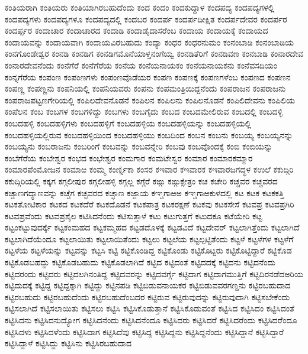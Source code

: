 {ಕಂತಿಯರಾಗಿ
ಕಂತಿಯರು
ಕಂತಿಯಾಗಿರಬಹುದೆಂದು
ಕಂದ
ಕಂದಂ
ಕಂದಕುದ್ದಾಳ
ಕಂದಪದ್ಯ
ಕಂದಪದ್ಯಗಳಲ್ಲಿ
ಕಂದಪದ್ಯಗಳು
ಕಂದಪದ್ಯಗಳೂ
ಕಂದಪದ್ಯದಲ್ಲಿ
ಕಂದಬರ
ಕಂದರ್ಪ
ಕಂದರ್ಪದೀಕ್ಷಿತ
ಕಂದರ್ಪದೇವರ
ಕಂದರ್ಪರ
ಕಂದರ್ಪ್ಪರ
ಕಂದಾಚಾರ
ಕಂದಾಚಾರದ
ಕಂದಾಡಿ
ಕಂದಾಡೈದಾಸರೆಂಬ
ಕಂದಾಯ
ಕಂದಾಯಕ್ಕೆ
ಕಂದಾಯದ
ಕಂದಾಯವನ್ನು
ಕಂದಾಯವಾಗಿ
ಕಂದಾಯವಿರಬಹುದು
ಕಂದ್ಯಾ
ಕಂಧರ
ಕಂಧರನುಮಂ
ಕಂನಂಬಾಡಿ
ಕಂನಂಬಾಡಿಯ
ಕಂನಗೊಂಡೇಶ್ವರ
ಕಂನಡಿ
ಕಂನಡಿಗ
ಕಂನಡಿಗಮೊನೆಯಾಳ್ತನಂಗೆಯ್ವ
ಕಂನಡಿತೆರಿಗೆ
ಕಂನಡಿವಣ
ಕಂನಬಾಡಿ
ಕಂನಾರದೇವ
ಕಂನಾರದೇವನೆಂದು
ಕಂನೆಗೆರೆ
ಕಂನೆಗೆರೆಯ
ಕಂನೆಯ
ಕಂನೆಯನಾಯಕಂ
ಕಂನೆಯನಾಯಕನು
ಕಂನೆವಸದಿಯಂ
ಕಂನ್ನಗೆರೆಯ
ಕಂಪಂಣ
ಕಂಪಂಣಗಳು
ಕಂಪಂಣವೊಡೆಯರ
ಕಂಪಣ
ಕಂಪಣಕ್ಕೆ
ಕಂಪಣಗಳೆಂಬ
ಕಂಪಣದ
ಕಂಪಣನ
ಕಂಪಣ್ಣ
ಕಂಪಣ್ಣನು
ಕಂಪನಿಯಲ್ಲಿ
ಕಂಪನಿಯವರು
ಕಂಪನು
ಕಂಪಮಂತ್ರಿಯಿದ್ದನೆಂದು
ಕಂಪರಾಜನ
ಕಂಪರಾಜನು
ಕಂಪರಾಜಪಟ್ಟಣಗೇರಿಯಲ್ಲಿ
ಕಂಪಿಲದೇವನೊಡನೆ
ಕಂಪಿಲನ
ಕಂಪಿಲನು
ಕಂಪಿಲನೊಡನೆ
ಕಂಪಿಲಿದೇವನು
ಕಂಪಿಲಿಯ
ಕಂಪೆಲನ
ಕಂಬ
ಕಂಬಗಳ
ಕಂಬಗಳಿದ್ದು
ಕಂಬಗಳು
ಕಂಬಗೈದು
ಕಂಬದ
ಕಂಬದಮೇಲಿರುವ
ಕಂಬದಲ್ಲಿ
ಕಂಬದಳ್ಳಿ
ಕಂಬದಹಳ್ಳಿ
ಕಂಬದಹಳ್ಳಿಗಳು
ಕಂಬದಹಳ್ಳಿಗೆ
ಕಂಬದಹಳ್ಳಿಯ
ಕಂಬದಹಳ್ಳಿಯನ್ನು
ಕಂಬದಹಳ್ಳಿಯಲ್ಲಿ
ಕಂಬದಹಳ್ಳಿಯಲ್ಲಿರುವ
ಕಂಬದಹಳ್ಳಿಯಿಂದ
ಕಂಬದಹಳ್ಳಿಯು
ಕಂಬದಿಂದ
ಕಂಬನ
ಕಂಬನು
ಕಂಬಯ್ಯ
ಕಂಬಯ್ಯನನ್ನು
ಕಂಬಯ್ಯನು
ಕಂಬರಾಜನು
ಕಂಬರಿಂಗೆ
ಕಂಬವನ್ನು
ಕಂಬವನ್ನೇರಿ
ಕಂಬವು
ಕಂಬವೊಂದಕ್ಕೆ
ಕಂಬಿ
ಕಂಬಿಯನ್ನು
ಕಂಬೆಗೆರೆಯ
ಕಂಬೇಶ್ವರ
ಕಂಭದ
ಕಂಭೇಶ್ವರ
ಕಂಮಗಾರ
ಕಂಮಟೇಸ್ವರ
ಕಂಮಾರ
ಕಂಮಾರಕಮ್ಮಾರ
ಕಂಮಾರಪೆಂಮೋಜನ
ಕಂಮಾಱ
ಕಂಮ್ಮ
ಕಂರ್ಣ್ನಿಕಾ
ಕಂಸರ
ಕಇವಾರ
ಕಇವಾರಕ
ಕಇವಾರಜಗದ್ಧಳ
ಕಉಲೆ
ಕಕುದ್ಗಿರಿ
ಕಕುದ್ಗಿರಿಯಲ್ಲಿ
ಕಕ್ಕಗ
ಕಗ್ಗಲೀಪುರ
ಕಗ್ಗಲೀಹಳ್ಳಿ
ಕಗ್ಗಲ್ಲ
ಕಗ್ಗೆರೆ
ಕಙ್ಗು
ಕಙ್ಗುಕ್ಸೇತ್ರಂ
ಕಚ
ಕಚೇರಿ
ಕಚ್ಚವರ
ಕಚ್ಚವರದ
ಕಚ್ಚಾಣಗದ್ಯಾಣವನ್ನು
ಕಚ್ಚೆಗ
ಕಚ್ಛವರದ
ಕಚ್ಛಾಣ
ಕಜ್ಜಾಯ
ಕಞ್ಚಗಾಱಅ
ಕಞ್ಚಗಾಱಕುಳದಲ್ಲಿ
ಕಟ
ಕಟಕ
ಕಟಕಕತ್ತಿ
ಕಟಕತೋಟಿಕಾರ
ಕಟಕದ
ಕಟಕದೆರೆ
ಕಟಕದೊಡನೆ
ಕಟಕಪಾತ್ರ
ಕಟಕರಕ್ಷಣೆ
ಕಟಕವು
ಕಟಕಸೇಸೆ
ಕಟವಪ್ರ
ಕಟವಪ್ರಗಿರಿ
ಕಟವಪ್ರವೆಂದು
ಕಟವಪ್ರಶೈಲ
ಕಟಿಸಿದನೆಂದು
ಕಟಿಸುತ್ತಾಳೆ
ಕಟು
ಕಟುಗುತ್ತಗೆ
ಕಟುದಕೂ
ಕಟೆಯೇರಿ
ಕಟ್ಟ
ಕಟ್ಟಂಕಟ್ಟುವುದರ್ಕ್ಕೆ
ಕಟ್ಟಕಂಮಹದ
ಕಟ್ಟಕಮ್ಮಹದ
ಕಟ್ಟಡದೊಳಕ್ಕೆ
ಕಟ್ಟಡವಿದೆ
ಕಟ್ಟದೇವರ್
ಕಟ್ಟಲಾಗಿತ್ತೆಂದು
ಕಟ್ಟಲಾಗಿದೆ
ಕಟ್ಟಲಾಗಿದೆಯೆಂದೂ
ಕಟ್ಟಲಾಯಿತು
ಕಟ್ಟಲಾಯಿತೆಂದು
ಕಟ್ಟಲು
ಕಟ್ಟಲೆಯ
ಕಟ್ಟಲ್ಪಟ್ಟಿತೆಂದು
ಕಟ್ಟಳೆ
ಕಟ್ಟಳೆಗಳ
ಕಟ್ಟಳೆಗೆ
ಕಟ್ಟಳೆಯ
ಕಟ್ಟಳೆಯನ್ನು
ಕಟ್ಟವನ್ನು
ಕಟ್ಟಸಿ
ಕಟ್ಟಿ
ಕಟ್ಟಿಕೊಂಡಿದ್ದ
ಕಟ್ಟಿಕೊಂಡು
ಕಟ್ಟಿಕೊಟ್ಟರು
ಕಟ್ಟಿಕೊಟ್ಟಿದ್ದಾರೆ
ಕಟ್ಟಿಕೊಡ
ಕಟ್ಟಿಕೊಡಬಹದ್ದು
ಕಟ್ಟಿಕೊಡಬಹುದು
ಕಟ್ಟಿಕೊಡಲಾಗಿದೆ
ಕಟ್ಟಿದ
ಕಟ್ಟಿದಂತೆ
ಕಟ್ಟಿದದಕ್ಕೆ
ಕಟ್ಟಿದನು
ಕಟ್ಟಿದನೆಂದು
ಕಟ್ಟಿದರಂದು
ಕಟ್ಟಿದರು
ಕಟ್ಟಿದಲಗಿನಂತಿದ್ದ
ಕಟ್ಟಿದವರನ್ನು
ಕಟ್ಟಿದವರ್ಗ್ಗೆ
ಕಟ್ಟಿದಾಗ
ಕಟ್ಟಿದಾಗಮುತ್ತಿಗೆ
ಕಟ್ಟಿದಿರನಡೆದಅರಿಯ
ಕಟ್ಟಿದುದಕ್ಕೆ
ಕಟ್ಟಿದ್ದ
ಕಟ್ಟಿದ್ದಕ್ಕಾಗಿ
ಕಟ್ಟಿದ್ದು
ಕಟ್ಟಿನಪಡಿ
ಕಟ್ಟಿಬಿಡುವನಾಯಕರ
ಕಟ್ಟಿಬಿಡುವವರಗಣ್ಡನು
ಕಟ್ಟಿರಬಹುದಾದ
ಕಟ್ಟಿರಬಹುದು
ಕಟ್ಟಿರಬಹುದೆಂದು
ಕಟ್ಟಿರಬಹುದೆಂಬದರ
ಕಟ್ಟಿರುವ
ಕಟ್ಟಿರುವುದನ್ನು
ಕಟ್ಟಿರುವುದಾಗಿ
ಕಟ್ಟಿಸಬೇಕೆಂದು
ಕಟ್ಟಿಸಲಾಗಿದೆ
ಕಟ್ಟಿಸಲಾಯಿತು
ಕಟ್ಟಿಸಲು
ಕಟ್ಟಿಸಿ
ಕಟ್ಟಿಸಿಕೊಡುತ್ತಾನೆ
ಕಟ್ಟಿಸಿಕೊಡುವಂತೆ
ಕಟ್ಟಿಸಿದ
ಕಟ್ಟಿಸಿದಂ
ಕಟ್ಟಿಸಿದಂತೆ
ಕಟ್ಟಿಸಿದನು
ಕಟ್ಟಿಸಿದನುದ್ಯೋಗ
ಕಟ್ಟಿಸಿದನೆಂದು
ಕಟ್ಟಿಸಿದನೆಂದೂ
ಕಟ್ಟಿಸಿದರು
ಕಟ್ಟಿಸಿದರೆ
ಕಟ್ಟಿಸಿದರೆಂದು
ಕಟ್ಟಿಸಿದರೆೆಂದೂ
ಕಟ್ಟಿಸಿದಳು
ಕಟ್ಟಿಸಿದಳೆಂದು
ಕಟ್ಟಿಸಿದಾಗ
ಕಟ್ಟಿಸಿದೆವು
ಕಟ್ಟಿಸಿದ್ದ
ಕಟ್ಟಿಸಿದ್ದನು
ಕಟ್ಟಿಸಿದ್ದನೆಂದು
ಕಟ್ಟಿಸಿದ್ದಾನೆ
ಕಟ್ಟಿಸಿದ್ದಾರೆ
ಕಟ್ಟಿಸಿದ್ದಾಳೆ
ಕಟ್ಟಿಸಿದ್ದು
ಕಟ್ಟಿಸಿನು
ಕಟ್ಟಿಸಿರಬಹುದಾದ
}
